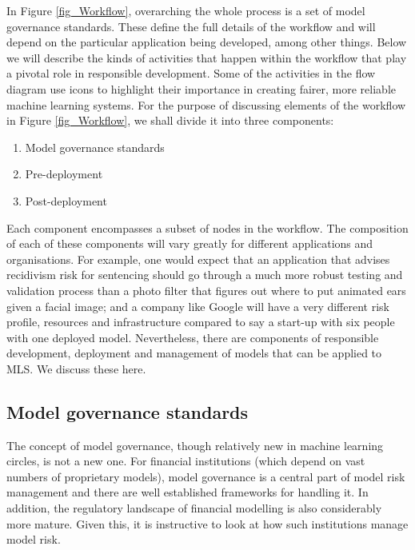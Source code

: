 In Figure \ref{fig_Workflow}, overarching the whole process is a set of model governance standards. These define the full details of the workflow and will depend on the particular application being developed, among other things. Below we will describe the kinds of activities that happen within the workflow that play a pivotal role in responsible development. Some of the activities in the flow diagram use icons to highlight their importance in creating fairer, more reliable machine learning systems. For the purpose of discussing elements of the workflow in Figure \ref{fig_Workflow}, we shall divide it into three components:
%
\begin{enumerate}
\item Model governance standards
\item Pre-deployment
\item Post-deployment
\end{enumerate}
%
Each component encompasses a subset of nodes in the workflow. The composition of each of these components will vary greatly for different applications and organisations. For example, one would expect that an application that advises recidivism risk for sentencing should go through a much more robust testing and validation process than a photo filter that figures out where to put animated ears given a facial image; and a company like Google will have a very different risk profile, resources and infrastructure compared to say a start-up with six people with one deployed model. Nevertheless, there are components of responsible development, deployment and management of models that can be applied to MLS. We discuss these here.

\subsection{Model governance standards}

The concept of model governance, though relatively new in machine learning circles, is not a new one. For financial institutions (which depend on vast numbers of proprietary models), model governance is a central part of model risk management and there are well established frameworks for handling it. In addition, the regulatory landscape of financial modelling is also considerably more mature. Given this, it is instructive to look at how such institutions manage model risk.

